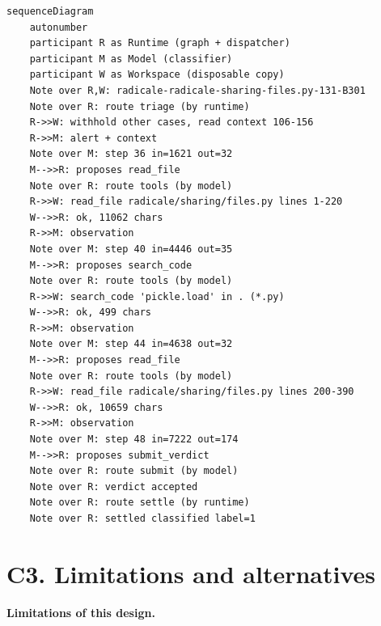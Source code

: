 \documentclass[
  10pt,
]{article}
\begin{document}
\begin{verbatim}
sequenceDiagram
    autonumber
    participant R as Runtime (graph + dispatcher)
    participant M as Model (classifier)
    participant W as Workspace (disposable copy)
    Note over R,W: radicale-radicale-sharing-files.py-131-B301
    Note over R: route triage (by runtime)
    R->>W: withhold other cases, read context 106-156
    R->>M: alert + context
    Note over M: step 36 in=1621 out=32
    M-->>R: proposes read_file
    Note over R: route tools (by model)
    R->>W: read_file radicale/sharing/files.py lines 1-220
    W-->>R: ok, 11062 chars
    R->>M: observation
    Note over M: step 40 in=4446 out=35
    M-->>R: proposes search_code
    Note over R: route tools (by model)
    R->>W: search_code 'pickle.load' in . (*.py)
    W-->>R: ok, 499 chars
    R->>M: observation
    Note over M: step 44 in=4638 out=32
    M-->>R: proposes read_file
    Note over R: route tools (by model)
    R->>W: read_file radicale/sharing/files.py lines 200-390
    W-->>R: ok, 10659 chars
    R->>M: observation
    Note over M: step 48 in=7222 out=174
    M-->>R: proposes submit_verdict
    Note over R: route submit (by model)
    Note over R: verdict accepted
    Note over R: route settle (by runtime)
    Note over R: settled classified label=1
\end{verbatim}

\clearpage
\section{C3. Limitations and
alternatives}\label{c3.-limitations-and-alternatives}

\textbf{Limitations of this design.}
\end{document}
